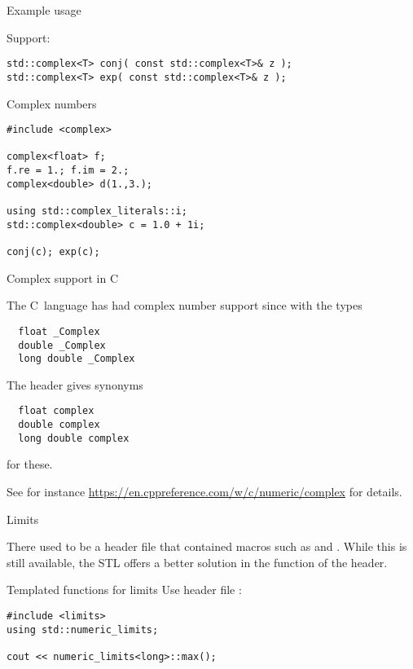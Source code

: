 \begin{block}{Example usage}
  \label{sl:complexvec}
\end{block}

Support:
\begin{lstlisting}
std::complex<T> conj( const std::complex<T>& z );
std::complex<T> exp( const std::complex<T>& z );
\end{lstlisting}

\begin{slide}{Complex numbers}
  \label{sl-complex}
\begin{lstlisting}
#include <complex>

complex<float> f;
f.re = 1.; f.im = 2.;
complex<double> d(1.,3.);

using std::complex_literals::i;
std::complex<double> c = 1.0 + 1i;

conj(c); exp(c);
\end{lstlisting}
\end{slide}

 {Complex support in C}

The C~language has had complex number support
since  with the types
\begin{lstlisting}
  float _Complex
  double _Complex
  long double _Complex
\end{lstlisting}
The header 
gives synonyms
\begin{lstlisting}
  float complex
  double complex
  long double complex
\end{lstlisting}
for these.

See for instance \url{https://en.cppreference.com/w/c/numeric/complex}
for details.

 {Limits}
\label{sec:limits}

There used to be a header file  that contained
macros such as  and .
While this is still available,
the \ac{STL} offers a better solution in the
 function
of the  header.

\begin{block}{Templated functions for limits}
  \label{sl:stl-limits}
  Use header file :
\begin{lstlisting}
#include <limits>
using std::numeric_limits;

cout << numeric_limits<long>::max();
\end{lstlisting}
\end{block}

